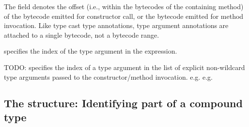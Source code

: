 \documentclass[10pt]{article}
\newcommand{\ttlcb}{\texttt{\char "7B}}
\newcommand{\ttrcb}{\texttt{\char "7D}}
\begin{document}
The  field denotes the offset (i.e., within the bytecodes
of the containing method) of the  bytecode emitted for
constructor call, or the
 bytecode emitted for
method invocation.  Like type cast type annotations, type argument
annotations are attached to a single bytecode, not a bytecode range.

 specifies the index of the type argument in the
expression.


TODO:  specifies the index of a type argument in the list
       of explicit non-wildcard type arguments passed to the
       constructor/method invocation.
       e.g. 
       e.g. 



\subsection{The  structure:  Identifying part of a compound type\label{class-file:ext:type_path}}

\newcommand{\emptypath}{\codefootnotesize{empty\_path}}
\newcommand{\arraypath}[1]{\codefootnotesize{array\_type\_path \ttlcb\ #1 \ttrcb}}
\newcommand{\innerpath}[1]{\codefootnotesize{inner\_type\_path \ttlcb\ #1 \ttrcb}}
\newcommand{\wildcardpath}[1]{\codefootnotesize{wildcard\_path \ttlcb\ #1 \ttrcb}}
\newcommand{\typeargpath}[2]{\codefootnotesize{type\_argument\_path \ttlcb\ #1, #2 \ttrcb}}
\end{document}
